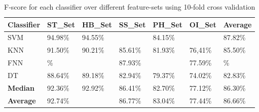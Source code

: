 \documentclass[journal,article,submit,moreauthors,pdftex]{Definitions/mdpi}
\begin{document}
\begin{table}[H]
	\caption{F-score for each classifier over different feature-sets using 10-fold cross validation }
	\centering
	\begin{tabular}{p{2cm}p{1.7cm}p{1.7cm}p{1.7cm}p{1.7cm}p{1.7cm}p{1.7cm}}
		\toprule
		\textbf{Classifier} & \textbf{ST\_Set} & \textbf{HB\_Set} & \textbf{SS\_Set} & \textbf{PH\_Set} & \textbf{OI\_Set} & Average \\
		\midrule
		SVM &  94.98\% & 94.55\% &\cellcolor{gray!35}{89.18\%} &84.15\% & \cellcolor{gray!35}{78.47\%} &87.82\%\\
		KNN & 91.50\% & 90.21\% & 85.61\% &81.93\% & 76,41\%& 85.50\% \\
		FNN & \cellcolor{gray!35}{95.31}\% & \cellcolor{gray!35}{95.89\%} &  87.93\% &\cellcolor{gray!35}{85.34\%} & 77.59\% & \cellcolor{gray!35}{88.29}\%\\
		DT & 88.64\% & 89.18\% &  82.94\% &79.37\% & 74.02\% &82.83\%\\
		\bottomrule
		\textbf{Median} & 92.36\% &  92.92\% &86.41\% & 82.70\% & 77.12\%&86.30\%\\
		\midrule
		\textbf{Average} & 92.74\% &  \cellcolor{gray!35}{93.30\%}  & 86.77\% &83.04\% & 77.44\% &86.66\%\\
		\bottomrule
	\end{tabular}
	\label{f1_classifier_featureset}
\end{table}
\end{document}
